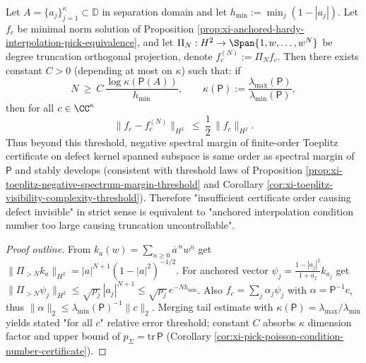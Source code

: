 \begin{proposition}\label{prop:xi-toeplitz-threshold-via-anchored-interpolation}
Let \(A=\{a_j\}_{j=1}^{\kappa}\subset\mathbb{D}\) in separation domain and let \(h_{\min}:=\min_j(1-|a_j|)\).
Let \(f_c\) be minimal norm solution of Proposition \ref{prop:xi-anchored-hardy-interpolation-pick-equivalence}, and let \(\Pi_N:H^2\to\Span\{1,w,\dots,w^N\}\) be degree truncation orthogonal projection, denote \(f_c^{(N)}:=\Pi_N f_c\).
Then there exists constant \(C>0\) (depending at most on \(\kappa\)) such that: if
\[
\boxed{\;
N\ \ge\ C\,\frac{\log\kappa(\mathsf P(A))}{h_{\min}},\qquad
\kappa(\mathsf P):=\frac{\lambda_{\max}(\mathsf P)}{\lambda_{\min}(\mathsf P)},\;}
\]
then for all \(c\in\CC^{\kappa}\)
\[
\boxed{\;
\|f_c-f_c^{(N)}\|_{H^2}\ \le\ \frac12\,\|f_c\|_{H^2}.\;}
\]
Thus beyond this threshold, negative spectral margin of finite-order Toeplitz certificate on defect kernel spanned subspace is same order as spectral margin of \(\mathsf P\) and stably develops (consistent with threshold laws of Proposition \ref{prop:xi-toeplitz-negative-spectrum-margin-threshold} and Corollary \ref{cor:xi-toeplitz-visibility-complexity-threshold}).
Therefore "insufficient certificate order causing defect invisible" in strict sense is equivalent to "anchored interpolation condition number too large causing truncation uncontrollable".
\end{proposition}
\begin{proof}[Proof outline]
From \(k_{a}(w)=\sum_{n\ge 0}\overline a^{\,n}w^n\) get \(\|\Pi_{>N}k_a\|_{H^2}=|a|^{N+1}(1-|a|^2)^{-1/2}\).
For anchored vector \(\psi_j=\frac{1-|a_j|^2}{1+\overline a_j}k_{a_j}\) get
\(
\|\Pi_{>N}\psi_j\|_{H^2}\le \sqrt{p_j}\,|a_j|^{N+1}\le \sqrt{p_j}\,e^{-Nh_{\min}}
\).
Also \(f_c=\sum_j\alpha_j\psi_j\) with \(\alpha=\mathsf P^{-1}c\), thus \(\|\alpha\|_2\le \lambda_{\min}(\mathsf P)^{-1}\|c\|_2\).
Merging tail estimate with \(\kappa(\mathsf P)=\lambda_{\max}/\lambda_{\min}\) yields stated "for all \(c\)" relative error threshold; constant \(C\) absorbs \(\kappa\) dimension factor and upper bound of \(p_\Sigma=\mathrm{tr}\,\mathsf P\) (Corollary \ref{cor:xi-pick-poisson-condition-number-certificate}).
\end{proof}

